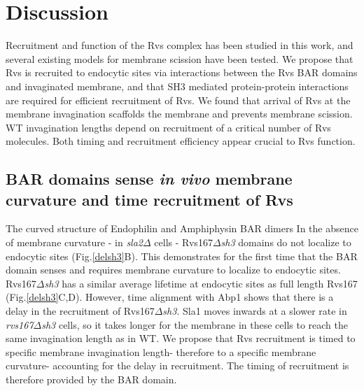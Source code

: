 \documentclass[9pt,lineno]{elife}
\begin{document}
\section{Discussion}
Recruitment and function of the Rvs complex has been studied in this work, and several existing models for membrane scission have been tested. We propose that Rvs is recruited to endocytic sites via interactions between the Rvs BAR domains and invaginated membrane, and that SH3 mediated protein-protein interactions are required for efficient recruitment of Rvs. We found that arrival of Rvs at the membrane invagination scaffolds the membrane and prevents membrane scission. WT invagination lengths depend on recruitment of a critical number of Rvs molecules. Both timing and recruitment efficiency appear crucial to Rvs function.

\subsection{BAR domains sense \textit{in vivo} membrane curvature and time recruitment of Rvs}
The curved structure of Endophilin and Amphiphysin BAR dimers \citep{Peters2004,Mim2012} In the absence of membrane curvature - in \textit{sla2$\Delta$} cells - Rvs167\textit{$\Delta$sh3} domains do not localize to endocytic sites (Fig.\ref{delsh3}B). This demonstrates for the first time that the BAR domain senses and requires membrane curvature to localize to endocytic sites. Rvs167\textit{$\Delta$sh3} has a similar average lifetime at endocytic sites as full length Rvs167 (Fig.\ref{delsh3}C,D). However, time alignment with Abp1 shows that there is a delay in the recruitment of Rvs167\textit{$\Delta$sh3}. Sla1 moves inwards at a slower rate in \textit{rvs167$\Delta$sh3} cells, so it takes longer for the membrane in these cells to reach the same invagination length as in WT. We propose that Rvs recruitment is timed to specific membrane invagination length- therefore to a specific membrane curvature-  accounting for the delay in recruitment. The timing of recruitment is therefore provided by the BAR domain.  
\end{document}
